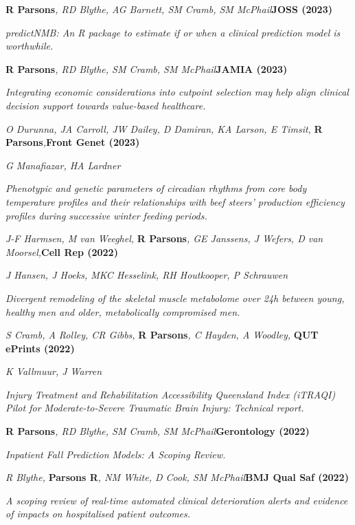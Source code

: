 \item
    \textbf{R Parsons}\textit{, RD Blythe, AG Barnett, SM Cramb, SM McPhail}\textbf{\hfill{JOSS (2023)}}\par
    \textit{predictNMB: An R package to estimate if or when a clinical prediction model is worthwhile.}
\item
    \textbf{R Parsons}\textit{, RD Blythe, SM Cramb, SM McPhail}\textbf{\hfill{JAMIA (2023)}}\par
    \textit{Integrating economic considerations into cutpoint selection may help align clinical decision support towards value-based healthcare.}
\item
    \textit{O Durunna, JA Carroll, JW Dailey, D Damiran, KA Larson, E Timsit, }\textbf{R Parsons}\textit{,}\textbf{\hfill{Front Genet (2023)}}\par
	\textit{G Manafiazar, HA Lardner}\par
    \textit{Phenotypic and genetic parameters of circadian rhythms from core body temperature profiles and their relationships with beef steers’ production efficiency profiles during successive winter feeding periods.}
\item
    \textit{J-F Harmsen, M van Weeghel, }\textbf{R Parsons}\textit{, GE Janssens, J Wefers, D van Moorsel,}\textbf{\hfill{Cell Rep (2022)}}\par
	\textit{J Hansen, J Hoeks, MKC Hesselink, RH Houtkooper, P Schrauwen}\par
    \textit{Divergent remodeling of the skeletal muscle metabolome over 24h between young, healthy men and older, metabolically compromised men.}
\item
    \textit{S Cramb, A Rolley, CR Gibbs, }\textbf{R Parsons}\textit{, C Hayden, A Woodley, }\textbf{\hfill{QUT ePrints (2022)}}\par
	\textit{K Vallmuur, J Warren}\par
	\textit{Injury Treatment and Rehabilitation Accessibility Queensland Index (iTRAQI) Pilot for Moderate-to-Severe Traumatic Brain Injury: Technical report.}
\item
    \textbf{R Parsons}\textit{, RD Blythe, SM Cramb, SM McPhail}\textbf{\hfill Gerontology (2022)}\par
	\textit{Inpatient Fall Prediction Models: A Scoping Review.}
\item
	\textit{R Blythe, }\textbf{Parsons R}\textit{, NM White, D Cook, SM McPhail}\textbf{\hfill{BMJ Qual Saf (2022)}}\par
	\textit{A scoping review of real-time automated clinical deterioration alerts and evidence of impacts on hospitalised patient outcomes.}
